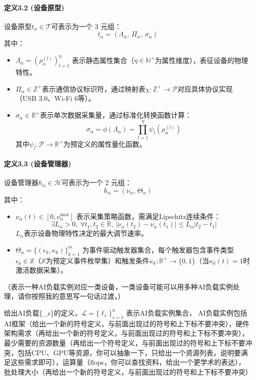 \paragraph{定义3.2 (设备原型)} 设备原型$t_\alpha \in \mathcal{T}$可表示为一个 3 元组：
\[
t_\alpha = (\Lambda_\alpha,\, \Pi_\alpha,\, \sigma_\alpha)
\]
其中：
\begin{itemize}
    \item $\Lambda_\alpha = (\rho^{(l)}_\alpha)_{l=1}^{\eta}$ 表示静态属性集合（$\eta \in \mathbb{N}^+$为属性维度），表征设备的物理特性。
    \item $\Pi_\alpha \in \mathbb{Z}^+$表示通信协议标识符，通过映射表$\chi: \mathbb{Z}^+ \to \mathcal{P}$对应具体协议实现（USB 3.0、Wi-Fi 6等）。
    \item $\sigma_\alpha \in \mathbb{R}^+$表示单次数据采集量，通过标准化转换函数计算：
        \[
        \sigma_\alpha = \phi(\Lambda_\alpha) = \prod_{l=1}^{\eta} \psi_l(\rho^{(l)}_\alpha)
        \]
        其中$\psi_l: \mathcal{P} \to \mathbb{R}^+$为预定义的属性量化函数。
\end{itemize}

\paragraph{定义3.3 (设备管理器)} 设备管理器$h_\alpha \in \mathcal{H}$可表示为一个 2 元组：
\[
h_\alpha = (\nu_\alpha,\, \Theta_\alpha)
\]
其中：
\begin{itemize}
    \item $\nu_\alpha(t) \in [0, \nu_\alpha^{\max}]$ 表示采集策略函数，需满足Lipschitz连续条件：
        \[
        \exists L_\alpha > 0,\ \forall t_1, t_2 \in \mathbb{R},\ |\nu_\alpha(t_2) - \nu_\alpha(t_1)| \leq L_\alpha |t_2 - t_1|
        \]
        $L_\alpha$表示设备物理特性决定的最大调节速率。        
    \item $\Theta_\alpha = \{(\epsilon_k, \kappa_k)\}_{k=1}^m$ 为事件驱动触发器集合，每个触发器包含事件类型$\epsilon_k \in \mathbb{X}$（$\mathbb{X}$为预定义事件枚举集）和触发条件$\kappa_k: \mathbb{R}^+ \to \{0,1\}$（当$\kappa_k(t)=1$时激活数据采集）。
\end{itemize}



（表示一种AI负载实例对应一类设备，一类设备可能可以用多种AI负载实例处理，请你按照我的意思写一句话过渡，）

给出AI负载\{\ell_s\}的定义，$\mathcal{L} = \{\ell_s\}_{s=1}^u$ 表示AI负载实例集合，
AI负载实例包括AI框架（给出一个新的符号定义，与前面出现过的符号和上下标不要冲突），硬件架构需求（再给出一个新的符号定义，与前面出现过的符号和上下标不要冲突），最少需要的资源数量（再给出一个符号定义，与前面出现过的符号和上下标不要冲突，包括CPU、GPU等资源，你可以抽象一下，只给出一个资源列表，说明要满足这些需求即可），运算量（flops，你可以查找资料，给出一个更学术的表达），批处理大小（再给出一个新的符号定义，与前面出现过的符号和上下标不要冲突）

